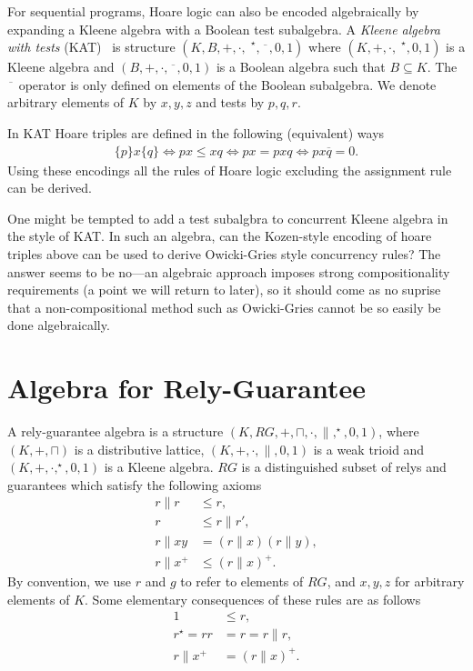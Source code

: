 \documentclass{llncs}
\begin{document}
For sequential programs, Hoare logic can also be encoded algebraically by
expanding a Kleene algebra with a Boolean test subalgebra. A
\emph{Kleene algebra with tests} (KAT)~\cite{kozen_kleene_1997} is structure
$(K,B,+,\cdot,\phantom{|}^\star,\overline{\phantom{x}},0,1)$ where
$(K,+,\cdot,\phantom{|}^\star,0,1)$ is a Kleene algebra and
$(B,+,\cdot,\overline{\phantom{x}},0,1)$ is a Boolean algebra such
that $B \subseteq K$. The $\overline{\phantom{x}}$ operator is only
defined on elements of the Boolean subalgebra. We denote arbitrary
elements of $K$ by $x,y,z$ and tests by $p,q,r$.

In KAT Hoare triples are defined in the following (equivalent) ways
\begin{align*}
\{p\}x\{q\} \iff px \le xq \iff px = pxq \iff px\overline{q} = 0.
\end{align*}
Using these encodings all the rules of Hoare logic excluding the
assignment rule can be derived.

One might be tempted to add a test subalgbra to concurrent Kleene
algebra in the style of KAT. In such an algebra, can the Kozen-style
encoding of hoare triples above can be used to derive Owicki-Gries
style concurrency rules? The answer seems to be no---an algebraic
approach imposes strong compositionality requirements (a point we will
return to later), so it should come as no suprise that a
non-compositional method such as Owicki-Gries cannot be so easily be
done algebraically.

\newpage
\section{Algebra for Rely-Guarantee}
\label{sec:RG}

A rely-guarantee algebra is a structure
$(K,RG,+,\sqcap,\cdot,\|,^\star,0,1)$, where $(K,+,\sqcap)$ is a
distributive lattice, $(K,+,\cdot,\|,0,1)$ is a weak trioid and
$(K,+,\cdot,^\star,0,1)$ is a Kleene algebra. $RG$ is a distinguished
subset of relys and guarantees which satisfy the following axioms
\begin{align}
r\|r &\le r, \label{rg1}\\
r &\le r\|r', \label{rg2}\\
r\|xy &= (r\|x)(r\|y), \label{rg3}\\
r\|x^+ &\le (r\|x)^+ \label{rg4}.
\end{align}
By convention, we use $r$ and $g$ to refer to elements of $RG$, and
$x,y,z$ for arbitrary elements of $K$. Some elementary consequences of these rules are as follows
\begin{align*}
1 &\le r,\\
r^\star = rr &= r = r\|r,\\
r\|x^+ &= (r\|x)^+.
\end{align*}
\end{document}
